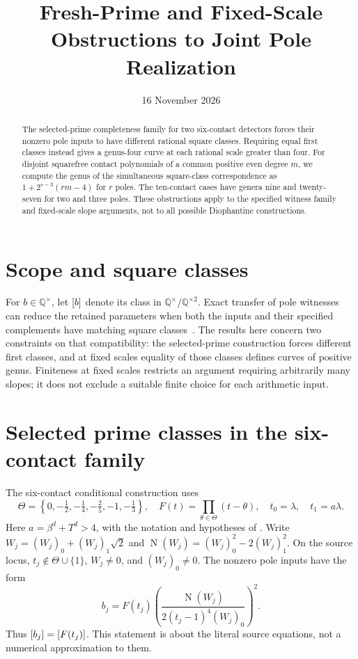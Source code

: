 \documentclass[11pt,a4paper]{article}
\title{Fresh-Prime and Fixed-Scale Obstructions to Joint Pole Realization}
\author{}\date{16 November 2026}
\theoremstyle{definition}\newtheorem{definition}[theorem]{Definition}
\theoremstyle{remark}\newtheorem{remark}[theorem]{Remark}
\newcommand{\Q}{\mathbb Q}\newcommand{\Z}{\mathbb Z}
\DeclareMathOperator{\N}{N}\DeclareMathOperator{\rad}{rad}
\begin{document}
\maketitle
\begin{abstract}
The selected-prime completeness family for two six-contact detectors
forces their nonzero pole inputs to have different rational square
classes. Requiring equal first classes instead gives a genus-four
curve at each rational scale greater than four. For disjoint
squarefree contact polynomials of a common positive even degree $m$,
we compute the genus of the simultaneous square-class correspondence
as $1+2^{r-3}(rm-4)$ for $r$ poles. The ten-contact cases have genera
nine and twenty-seven for two and three poles. These obstructions
apply to the specified witness family and fixed-scale slope
arguments, not to all possible Diophantine constructions.
\end{abstract}

\section{Scope and square classes}
For $b\in\Q^\times$, let $[b]$ denote its class in
$\Q^\times/\Q^{\times2}$. Exact transfer of pole witnesses can
reduce the retained parameters when both the inputs and their
specified complements have matching square classes~\cite{JointRealization}.
The results here concern two constraints on that compatibility:
the selected-prime construction forces different first classes,
and at fixed scales equality of those classes defines curves of
positive genus. Finiteness at fixed scales restricts an argument
requiring arbitrarily many slopes; it does not exclude a suitable
finite choice for each arithmetic input.

\section{Selected prime classes in the six-contact family}
The six-contact conditional construction uses
\begin{equation}\label{eq:F}
 \Theta=\left\{0,-\tfrac12,-\tfrac14,-\tfrac25,-1,-\tfrac13\right\},
 \quad F(t)=\prod_{\theta\in\Theta}(t-\theta),\quad
 t_0=\lambda,\quad t_1=a\lambda.
\end{equation}
Here $a=\beta^d+T^d>4$, with the notation and hypotheses of
\cite{Input13,UnitNorm}. Write $W_j=(W_j)_0+(W_j)_1\sqrt2$
and $\N(W_j)=(W_j)_0^2-2(W_j)_1^2$. On the source locus,
$t_j\notin\Theta\cup\{1\}$, $W_j\ne0$, and $(W_j)_0\ne0$.
The nonzero pole inputs have the form
\begin{equation}\label{eq:actualclass}
 b_j=F(t_j)\left(\frac{\N(W_j)}{2(t_j-1)^4(W_j)_0}\right)^2.
\end{equation}
Thus $[b_j]=[F(t_j)]$. This statement is about the literal
source equations, not a numerical approximation to them.
\end{document}
